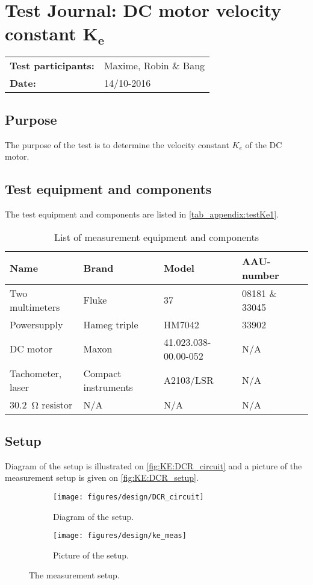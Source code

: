 \chapter{Test Journal: DC motor velocity constant $\boldsymbol{K_e}$} \label{test:Ke}
\begin{table}[!h]
\begin{tabular}{l l}
\textbf{Test participants:} & Maxime, Robin \& Bang  \\
\textbf{Date:}  & 14/10-2016
\end{tabular}
\end{table}

\section*{Purpose}
The purpose of the test is to determine the velocity constant $K_e$ of the DC motor. 
\section*{Test equipment and components}
The test equipment and components are listed in \autoref{tab_appendix:testKe1}.
\begin{table}[h]
	\centering
	\caption{List of measurement equipment and components}\label{tab_appendix:testKe1}

	\begin{tabularx}{\textwidth}{lXXXX}
		Name 				& Brand	& Model & AAU-number									\\ \toprule \rowcolor{lightGrey}
		Two multimeters	& Fluke & 37 & 08181 \& 33045	\\
		Powersupply	& Hameg triple & HM7042 & 33902\\ \rowcolor{lightGrey}
		DC motor & Maxon & 41.023.038-00.00-052& N/A \\
		Tachometer, laser & Compact instruments & A2103/LSR & N/A \\ \rowcolor{lightGrey}
		\SI{30.2}{\ohm} resistor & N/A & N/A & N/A \\ 
	\end{tabularx}
\end{table}
\section*{Setup}
Diagram of the setup is illustrated on \autoref{fig:KE:DCR_circuit} and a picture of the measurement setup is given on \autoref{fig:KE:DCR_setup}. 
\begin{figure}[h!]
    \centering
    \begin{subfigure}{0.50\textwidth}
        \texttt{[image: figures/design/DCR\_circuit]}
        \caption{Diagram of the setup.} \label{fig:KE:DCR_circuit}
    \end{subfigure}
    \begin{subfigure}{0.40\textwidth}
        \texttt{[image: figures/design/ke\_meas]}
        \caption{Picture of the setup.} \label{fig:KE:DCR_setup}
    \end{subfigure}
    \caption{The measurement setup.}    
\end{figure}

